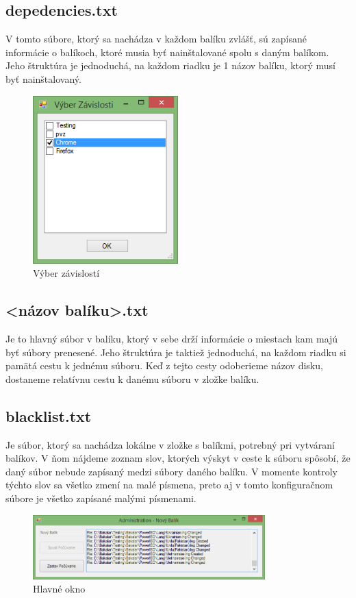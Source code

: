 \subsection{depedencies.txt}
V tomto súbore, ktorý sa nachádza v každom balíku zvlášť, sú zapísané informácie o balíkoch, ktoré musia byť nainštalované spolu s daným balíkom. Jeho štruktúra je jednoduchá, na každom riadku je 1 názov balíku, ktorý musí byť nainštalovaný.
\begin{figure}[h]
    \centering
    \includegraphics[width=0.5\textwidth]{depend}
    \caption{Výber závislostí}
    \label{fig:depend}
\end{figure}

\subsection{\textless názov balíku\textgreater.txt}
Je to hlavný súbor v balíku, ktorý v sebe drží informácie o miestach kam majú byť súbory prenesené. Jeho štruktúra je taktiež jednoduchá, na každom riadku si pamätá cestu k jednému súboru. Keď z tejto cesty odoberieme názov disku, dostaneme relatívnu cestu k danému súboru v zložke balíku.

\subsection{blacklist.txt}
Je súbor, ktorý sa nachádza lokálne v zložke s balíkmi, potrebný pri vytváraní balíkov. V ňom nájdeme zoznam slov, ktorých výskyt v ceste k súboru spôsobí, že daný súbor nebude zapísaný medzi súbory daného balíku. V momente kontroly týchto slov sa všetko zmení na malé písmena, preto aj v tomto konfiguračnom súbore je všetko zapísané malými písmenami.
\begin{figure}[h]
    \centering
    \includegraphics[width=0.8\textwidth]{hlavne}
    \caption{Hlavné okno}
    \label{fig:hlavne}
\end{figure}

